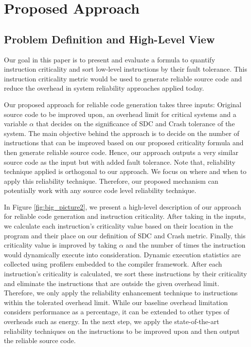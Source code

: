 \section{Proposed Approach}\label{sec:approach}
\subsection{Problem Definition and High-Level View}
Our goal in this paper is to present and evaluate a formula to quantify instruction criticality and sort low-level instructions by their fault tolerance. This instruction criticality metric would be used to generate reliable source code and reduce the overhead in system reliability approaches applied today. 

Our proposed approach for reliable code generation takes three inputs: Original source code to be improved upon, an overhead limit for critical systems and a variable $\alpha$ that decides on the significance of SDC and Crash tolerance of the system. The main objective behind the approach is to decide on the number of instructions that can be improved based on our proposed criticality formula and then generate reliable source code. Hence, our approach outputs a very similar source code as the input but with added fault tolerance. Note that, reliability technique applied is orthogonal to our approach. We focus on where and when to apply this reliability technique. Therefore, our proposed mechanism can potentially work with any source code level reliability technique. 

In Figure \ref{fig:big_picture2}, we present a high-level description of our approach for reliable code generation and instruction criticality. After taking in the inputs, we calculate each instruction's criticality value based on their location in the program and their place on our definition of SDC and Crash metric. Finally, this criticality value is improved by taking $\alpha$ and the number of times the instruction would dynamically execute into consideration. Dynamic execution statistics are collected using profilers embedded to the compiler framework. After each instruction's criticality is calculated, we sort these instructions by their criticality and eliminate the instructions that are outside the given overhead limit. Therefore, we only apply the reliability enhancement technique to instructions within the tolerated overhead limit. While our baseline overhead limitation considers performance as a percentage, it can be extended to other types of overheads such as energy. In the next step, we apply the state-of-the-art reliability techniques on the instructions to be improved upon and then output the reliable source code. 

